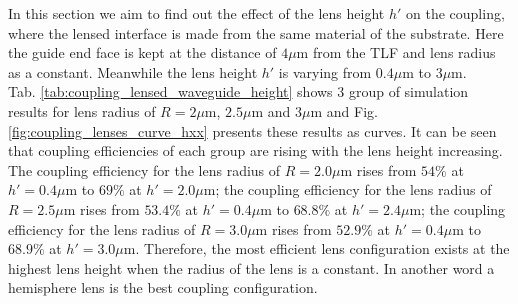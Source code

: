 In this section we aim to find out the effect of the lens height $h'$ on the coupling, where the lensed interface is made from the same material of the substrate. Here the guide end face is kept at the distance of $4\mu$m from the TLF and lens radius as a constant. Meanwhile the lens height $h'$ is varying from $0.4\mu$m to $3\mu$m. \\

Tab. \ref{tab:coupling_lensed_waveguide_height} shows 3 group of simulation results for lens radius of $R=2\mu$m, $2.5\mu$m and $3\mu$m and Fig. \ref{fig:coupling_lenses_curve_hxx} presents these results as curves. It can be seen that coupling efficiencies of each group are rising with the lens height increasing.  The coupling efficiency for the lens radius of $R=2.0\mu$m rises from $54\%$ at $h'=0.4\mu$m to $69\%$ at $h'=2.0\mu$m; the coupling efficiency for the lens radius of $R=2.5\mu$m rises from $53.4\%$ at $h'=0.4\mu$m to $68.8\%$ at $h'=2.4\mu$m; the coupling efficiency for the lens radius of $R=3.0\mu$m rises from $52.9\%$ at $h'=0.4\mu$m to $68.9\%$ at $h'=3.0\mu$m. Therefore, the most efficient lens configuration exists at the highest lens height when the radius of the lens is a constant. In another word a hemisphere lens is the best coupling configuration. \\

